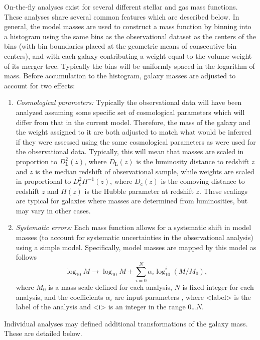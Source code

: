 On-the-fly analyses exist for several different stellar and gas mass functions. These analyses share several common features which are described below. In general, the model masses are used to construct a mass function by binning into a histogram using the same bins as the observational dataset as the centers of the bins (with bin boundaries placed at the geometric means of consecutive bin centers), and with each galaxy contributing a weight equal to the volume weight of its merger tree. Typically the bins will be uniformly spaced in the logarithm of mass. Before accumulation to the histogram, galaxy masses are adjusted to account for two effects:
\begin{enumerate}
\item \emph{Cosmological parameters:} Typically the observational data will have been analyzed assuming some specific set of cosmological parameters which will differ from that in the current model. Therefore, the mass of the galaxy and the weight assigned to it are both adjusted to match what would be inferred if they were assessed using the same cosmological parameters as were used for the observational data. Typically, this will mean that masses are scaled in proportion to $D_\mathrm{L}^2(\bar{z})$, where $D_\mathrm{L}(z)$ is the luminosity distance to redshift $z$ and $\bar{z}$ is the median redshift of observational sample, while weights are scaled in proportional to $D_\mathrm{c}^2 H^{-1}(z)$, where $D_\mathrm{c}(z)$ is the comoving distance to redshift $z$ and $H(z)$ is the Hubble parameter at redshift $z$. These scalings are typical for galaxies where masses are determined from luminosities, but may vary in other cases.
\item \emph{Systematic errors:} Each mass function allows for a systematic shift in model masses (to account for systematic uncertainties in the observational analysis) using a simple model. Specifically, model masses are mapped by this model as follows
\begin{equation}
\log_\mathrm{10} M \rightarrow \log_{10} M + \sum_{i=0}^N \alpha_i \log^i_{10}(M/M_0),
\end{equation}
where $M_0$ is a mass scale defined for each analysis, $N$ is fixed integer for each analysis, and the coefficients $\alpha_i$ are input parameters {\normalfont {}}, where {\normalfont \ttfamily \textless label\textgreater} is the label of the analysis and {\normalfont \ttfamily \textless i\textgreater} is an integer in the range 0\ldots$N$.
\end{enumerate}
Individual analyses may defined additional transformations of the galaxy mass. These are detailed below.

